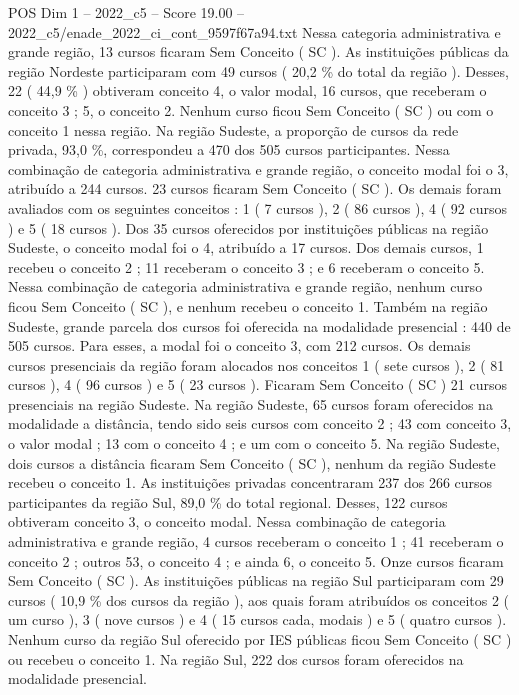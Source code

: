 \begin{textsample}{POS Dim 1 – 2022\_c5 – Score 19.00 – 2022\_c5/enade\_2022\_ci\_cont\_9597f67a94.txt}
Nessa categoria administrativa e grande região, 13 cursos ficaram Sem Conceito ( SC ).
As instituições públicas da região Nordeste participaram com 49 cursos ( 20,2 \% do total da região ).
Desses, 22 ( 44,9 \% ) obtiveram conceito 4, o valor modal, 16 cursos, que receberam o conceito 3 ; 5, o conceito 2.
Nenhum curso ficou Sem Conceito ( SC ) ou com o conceito 1 nessa região.
Na região Sudeste, a proporção de cursos da rede privada, 93,0 \%, correspondeu a 470 dos 505 cursos participantes.
Nessa combinação de categoria administrativa e grande região, o conceito modal foi o 3, atribuído a 244 cursos. 23 cursos ficaram Sem Conceito ( SC ).
Os demais foram avaliados com os seguintes conceitos : 1 ( 7 cursos ), 2 ( 86 cursos ), 4 ( 92 cursos ) e 5 ( 18 cursos ).
Dos 35 cursos oferecidos por instituições públicas na região Sudeste, o conceito modal foi o 4, atribuído a 17 cursos.
Dos demais cursos, 1 recebeu o conceito 2 ; 11 receberam o conceito 3 ; e 6 receberam o conceito 5.
Nessa combinação de categoria administrativa e grande região, nenhum curso ficou Sem Conceito ( SC ), e nenhum recebeu o conceito 1.
Também na região Sudeste, grande parcela dos cursos foi oferecida na modalidade presencial : 440 de 505 cursos.
Para esses, a modal foi o conceito 3, com 212 cursos.
Os demais cursos presenciais da região foram alocados nos conceitos 1 ( sete cursos ), 2 ( 81 cursos ), 4 ( 96 cursos ) e 5 ( 23 cursos ).
Ficaram Sem Conceito ( SC ) 21 cursos presenciais na região Sudeste.
Na região Sudeste, 65 cursos foram oferecidos na modalidade a distância, tendo sido seis cursos com conceito 2 ; 43 com conceito 3, o valor modal ; 13 com o conceito 4 ; e um com o conceito 5.
Na região Sudeste, dois cursos a distância ficaram Sem Conceito ( SC ), nenhum da região Sudeste recebeu o conceito 1.
As instituições privadas concentraram 237 dos 266 cursos participantes da região Sul, 89,0 \% do total regional.
Desses, 122 cursos obtiveram conceito 3, o conceito modal.
Nessa combinação de categoria administrativa e grande região, 4 cursos receberam o conceito 1 ; 41 receberam o conceito 2 ; outros 53, o conceito 4 ; e ainda 6, o conceito 5.
Onze cursos ficaram Sem Conceito ( SC ).
As instituições públicas na região Sul participaram com 29 cursos ( 10,9 \% dos cursos da região ), aos quais foram atribuídos os conceitos 2 ( um curso ), 3 ( nove cursos ) e 4 ( 15 cursos cada, modais ) e 5 ( quatro cursos ).
Nenhum curso da região Sul oferecido por IES públicas ficou Sem Conceito ( SC ) ou recebeu o conceito 1.
Na região Sul, 222 dos cursos foram oferecidos na modalidade presencial.

\end{textsample}
